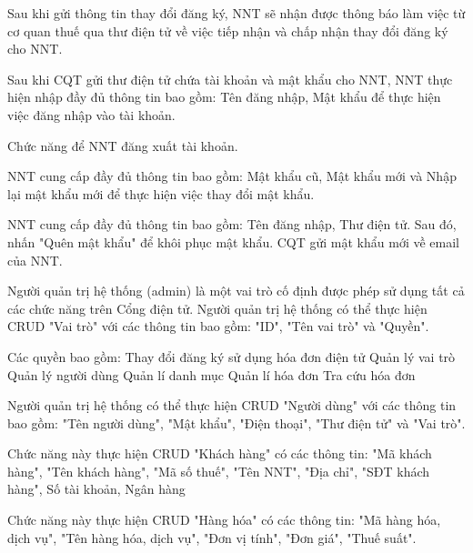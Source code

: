 Sau khi gửi thông tin thay đổi đăng ký, NNT sẽ nhận được thông báo làm việc từ cơ quan thuế qua thư điện tử về việc tiếp nhận và chấp nhận thay đổi đăng ký cho NNT.


Sau khi CQT gửi thư điện tử chứa tài khoản và mật khẩu cho NNT, NNT thực hiện nhập đầy đủ thông tin bao gồm: Tên đăng nhập, Mật khẩu để thực hiện việc đăng nhập vào tài khoản.


Chức năng để NNT đăng xuất tài khoản.


NNT cung cấp đầy đủ thông tin bao gồm: Mật khẩu cũ, Mật khẩu mới và Nhập lại mật khẩu mới để thực hiện việc thay đổi mật khẩu.


NNT cung cấp đầy đủ thông tin bao gồm: Tên đăng nhập, Thư điện tử. Sau đó, nhấn "Quên mật khẩu" để khôi phục mật khẩu. CQT gửi mật khẩu mới về email của NNT.



Người quản trị hệ thống (admin) là một vai trò cố định được phép sử dụng tất cả các chức năng trên Cổng điện tử.
Người quản trị hệ thống có thể thực hiện CRUD "Vai trò" với các thông tin bao gồm: "ID", "Tên vai trò" và "Quyền".

Các quyền bao gồm:
Thay đổi đăng ký sử dụng hóa đơn điện tử
Quản lý vai trò
Quản lý người dùng
Quản lí danh mục
Quản lí hóa đơn
Tra cứu hóa đơn


Người quản trị hệ thống có thể thực hiện CRUD "Người dùng" với các thông tin bao gồm: "Tên người dùng", "Mật khẩu", "Điện thoại", "Thư điện tử" và "Vai trò".



Chức năng này thực hiện CRUD "Khách hàng" có các thông tin: "Mã khách hàng", "Tên khách hàng", "Mã số thuế", "Tên NNT", "Địa chỉ", "SĐT khách hàng", Số tài khoản, Ngân hàng


Chức năng này thực hiện CRUD "Hàng hóa" có các thông tin: "Mã hàng hóa, dịch vụ", "Tên hàng hóa, dịch vụ", "Đơn vị tính", "Đơn giá", "Thuế suất".

